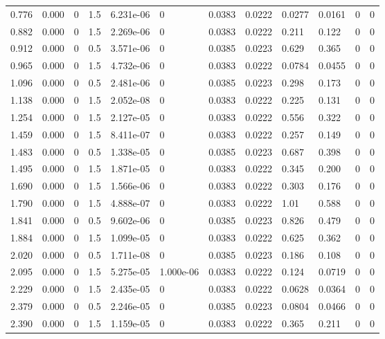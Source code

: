 \documentclass[preview]{standalone}
\begin{document}
{{\begin{tabular}{L{1.2cm}C{1.2cm} C{0.3cm}C{0.5cm} C{1.4cm}C{1.4cm} C{1.4cm}C{1.4cm} C{1.6cm}C{1.6cm} C{1.6cm}C{1.6cm}}
  0.776  &  0.000  & 0     & 1.5 &  6.231e-06  & 0  &  0.0383&   0.0222& 0.0277 & 0.0161   &  0 & 0  \\ 
  0.882  &  0.000  & 0     & 1.5 &  2.269e-06  & 0  &  0.0383&   0.0222& 0.211 & 0.122   &  0 & 0  \\ 
  0.912  &  0.000  & 0     & 0.5 &  3.571e-06  & 0  &  0.0385&   0.0223& 0.629 & 0.365   &  0 & 0  \\ 
  0.965  &  0.000  & 0     & 1.5 &  4.732e-06  & 0  &  0.0383&   0.0222& 0.0784 & 0.0455   &  0 & 0  \\ 
  1.096  &  0.000  & 0     & 0.5 &  2.481e-06  & 0  &  0.0385&   0.0223& 0.298 & 0.173   &  0 & 0  \\ 
  1.138  &  0.000  & 0     & 1.5 &  2.052e-08  & 0  &  0.0383&   0.0222& 0.225 & 0.131   &  0 & 0  \\ 
  1.254  &  0.000  & 0     & 1.5 &  2.127e-05  & 0  &  0.0383&   0.0222& 0.556 & 0.322   &  0 & 0  \\ 
  1.459  &  0.000  & 0     & 1.5 &  8.411e-07  & 0  &  0.0383&   0.0222& 0.257 & 0.149   &  0 & 0  \\ 
  1.483  &  0.000  & 0     & 0.5 &  1.338e-05  & 0  &  0.0385&   0.0223& 0.687 & 0.398   &  0 & 0  \\ 
  1.495  &  0.000  & 0     & 1.5 &  1.871e-05  & 0  &  0.0383&   0.0222& 0.345 & 0.200   &  0 & 0  \\ 
  1.690  &  0.000  & 0     & 1.5 &  1.566e-06  & 0  &  0.0383&   0.0222& 0.303 & 0.176   &  0 & 0  \\ 
  1.790  &  0.000  & 0     & 1.5 &  4.888e-07  & 0  &  0.0383&   0.0222& 1.01 & 0.588   &  0 & 0  \\ 
  1.841  &  0.000  & 0     & 0.5 &  9.602e-06  & 0  &  0.0385&   0.0223& 0.826 & 0.479   &  0 & 0  \\ 
  1.884  &  0.000  & 0     & 1.5 &  1.099e-05  & 0  &  0.0383&   0.0222& 0.625 & 0.362   &  0 & 0  \\ 
  2.020  &  0.000  & 0     & 0.5 &  1.711e-08  & 0  &  0.0385&   0.0223& 0.186 & 0.108   &  0 & 0  \\ 
  2.095  &  0.000  & 0     & 1.5 &  5.275e-05  & 1.000e-06  &  0.0383&   0.0222& 0.124 & 0.0719   &  0 & 0  \\ 
  2.229  &  0.000  & 0     & 1.5 &  2.435e-05  & 0  &  0.0383&   0.0222& 0.0628 & 0.0364   &  0 & 0  \\ 
  2.379  &  0.000  & 0     & 0.5 &  2.246e-05  & 0  &  0.0385&   0.0223& 0.0804 & 0.0466   &  0 & 0  \\ 
  2.390  &  0.000  & 0     & 1.5 &  1.159e-05  & 0  &  0.0383&   0.0222& 0.365 & 0.211   &  0 & 0  \\ 

\end{tabular}}}
\end{document}
